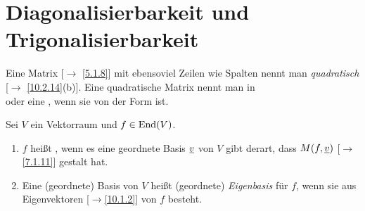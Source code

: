 \documentclass[../../main.tex]{subfiles}
\begin{document}
\section{Diagonalisierbarkeit und Trigonalisierbarkeit}

\begin{remdef}\label{10.3.1}
Eine Matrix [$\to$ \ref{5.1.8}] mit ebensoviel Zeilen wie Spalten nennt man \emph{quadratisch} [$\to$ \ref{10.2.14}(b)]. Eine quadratische Matrix nennt man in\\
 oder eine , wenn sie von der Form
 ist.
\end{remdef}

\begin{df}\label{10.3.2}
Sei $V$ ein Vektorraum und $f\in \operatorname{End}(V)$.
\begin{enumerate}[\normalfont(a)]
\item $f$ heißt , wenn es eine geordnete Basis ${\underline v}$ von $V$ gibt derart, dass $M(f,{\underline v})$ [$\to$ \ref{7.1.11}] gestalt hat.
\item Eine (geordnete) Basis von $V$ heißt (geordnete) \emph{Eigenbasis} für $f$, wenn sie aus Eigenvektoren [$\to$\ref{10.1.2}] von $f$ besteht.
\end{enumerate}
\end{df}
\end{document}

